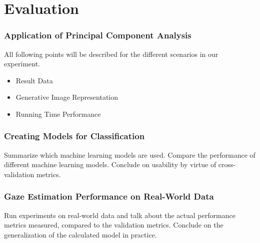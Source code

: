 \section{Evaluation}
\subsubsection{Application of Principal Component Analysis}
\label{ssub:Application of Principal Component Analysis}
All following points will be described for the different scenarios in our experiment.
\begin{itemize}
  \item Result Data
  \item Generative Image Representation
  \item Running Time Performance
\end{itemize}
\subsubsection{Creating Models for Classification}
\label{ssub:Creating Models for Classification}
Summarize which machine learning models are used.
Compare the performance of different machine learning models.
Conclude on usability by virtue of cross-validation metrics.
\subsubsection{Gaze Estimation Performance on Real-World Data}
\label{ssub:Gaze Estimation Performance on Real-World Data}
Run experiments on real-world data and talk about the actual performance metrics measured, compared to the validation metrics.
Conclude on the generalization of the calculated model in practice.
